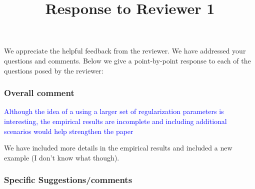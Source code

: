 \documentclass[]{article}
\title{Response to Reviewer 1}
\newcommand{\overall}[1]{\textcolor{blue}{#1}}
\begin{document}
	
	\maketitle
	
	We appreciate the helpful feedback from the reviewer. We have addressed your questions and comments. Below we give a point-by-point response to each of the questions posed by the reviewer:
	
	\subsubsection*{Overall comment}
	\overall{Although the idea of a using a larger set of regularization parameters is interesting, the empirical results are incomplete and including additional scenarios would help strengthen the paper}
		
	We have included more details in the empirical results and included a new example (I don't know what though).	
		
	\subsubsection*{Specific Suggestions/comments}
	
\end{document}

